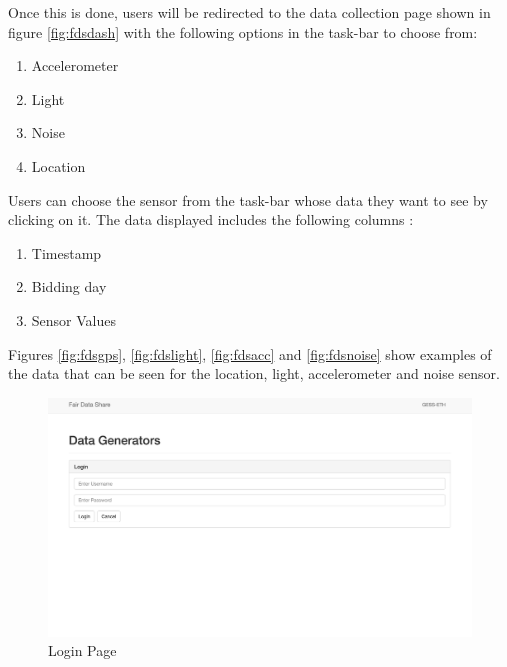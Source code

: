 Once this is done, users will be redirected to the data collection page shown in figure \ref{fig:fdsdash} with the following options in the task-bar  to choose from:

\begin{enumerate}
    \item Accelerometer
    \item Light
    \item Noise
    \item Location
\end{enumerate}

Users can choose the sensor from the task-bar whose data they want to see by clicking on it. The data displayed includes the following columns :

\begin{enumerate}
    \item Timestamp
    \item Bidding day
    \item Sensor Values
\end{enumerate}

Figures \ref{fig:fdsgps}, \ref{fig:fdslight}, \ref{fig:fdsacc} and \ref{fig:fdsnoise} show examples of the data that can be seen for the location,
light, accelerometer and noise sensor.



  


\begin{figure}[ht!]
\centering
\includegraphics[width=\textwidth,keepaspectratio]{./images/fds_user_login}
\caption{Login Page\label{fig:fdslogin}}
\end{figure}

